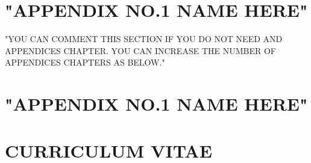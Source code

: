 \documentclass[12pt]{report}
\begin{document}

{}


\begin{appendices}
\chapter{"APPENDIX NO.1 NAME HERE"}
\label{appx: "LABEL HERE"}
\onehalfspacing

"YOU CAN COMMENT THIS SECTION IF YOU DO NOT NEED AND APPENDICES CHAPTER. YOU CAN INCREASE THE NUMBER OF APPENDICES CHAPTERS AS BELOW."

\chapter{"APPENDIX NO.1 NAME HERE"}
\label{sec: "LABEL HERE"}


\end{appendices}

\chapter*{CURRICULUM VITAE}
\end{document}
